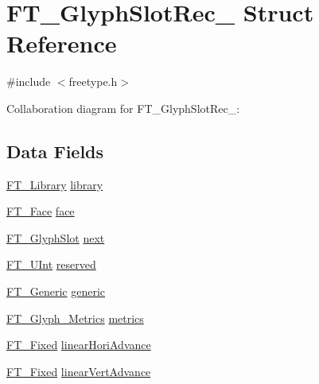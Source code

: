 \hypertarget{struct_f_t___glyph_slot_rec__}{}\section{F\+T\+\_\+\+Glyph\+Slot\+Rec\+\_\+ Struct Reference}
\label{struct_f_t___glyph_slot_rec__}


{\ttfamily \#include $<$freetype.\+h$>$}



Collaboration diagram for F\+T\+\_\+\+Glyph\+Slot\+Rec\+\_\+\+:
\subsection*{Data Fields}
\begin{DoxyCompactItemize}
\item 
\hyperlink{freetype_8h_a92857f8bf079b7b9ef5d3ce74cf89ef5}{F\+T\+\_\+\+Library} \hyperlink{struct_f_t___glyph_slot_rec___a5415bcbf70efb3aae7a6b77040e21e91}{library}
\item 
\hyperlink{freetype_8h_a7eba045ee20968354fa1bff0f69740fa}{F\+T\+\_\+\+Face} \hyperlink{struct_f_t___glyph_slot_rec___a0f5dbaf7d539bf2d92ecdff740342b04}{face}
\item 
\hyperlink{freetype_8h_a768daa0d9c3fa499e6c37034ee9f2ca3}{F\+T\+\_\+\+Glyph\+Slot} \hyperlink{struct_f_t___glyph_slot_rec___af339309df5ebe70dfa62a9f4f8838440}{next}
\item 
\hyperlink{fttypes_8h_abcb8db4dbf35d2b55a9e8c7b0926dc52}{F\+T\+\_\+\+U\+Int} \hyperlink{struct_f_t___glyph_slot_rec___ae829996584939557dfe46c4e4f2b28a8}{reserved}
\item 
\hyperlink{fttypes_8h_ae15e8550dd7d863328686aadaead5c77}{F\+T\+\_\+\+Generic} \hyperlink{struct_f_t___glyph_slot_rec___ac2d04848997fba660e17bc00760ef14f}{generic}
\item 
\hyperlink{freetype_8h_aba844698c24c1c12727c60a6fc0a9b3d}{F\+T\+\_\+\+Glyph\+\_\+\+Metrics} \hyperlink{struct_f_t___glyph_slot_rec___abe1ba307281c06a232f50e34c061ce7b}{metrics}
\item 
\hyperlink{fttypes_8h_a5f5a679cc09f758efdd0d1c5feed3c3d}{F\+T\+\_\+\+Fixed} \hyperlink{struct_f_t___glyph_slot_rec___a9d0ba6b09729d4f009ef380e267607c3}{linear\+Hori\+Advance}
\item 
\hyperlink{fttypes_8h_a5f5a679cc09f758efdd0d1c5feed3c3d}{F\+T\+\_\+\+Fixed} \hyperlink{struct_f_t___glyph_slot_rec___abc10f58c3d859e46694515956aa4a1e8}{linear\+Vert\+Advance}
\item 

\end{DoxyCompactItemize}
